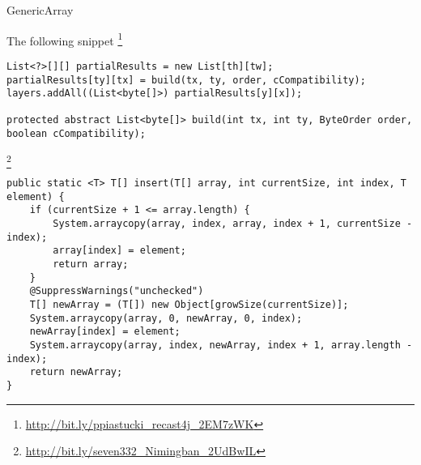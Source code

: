 \begin{pattern}{GenericArray}

\instances{}
The following snippet%
\footnote{\url{http://bit.ly/ppiastucki_recast4j_2EM7zWK}}

\begin{verbatim}
List<?>[][] partialResults = new List[th][tw];
partialResults[ty][tx] = build(tx, ty, order, cCompatibility);
layers.addAll((List<byte[]>) partialResults[y][x]);

protected abstract List<byte[]> build(int tx, int ty, ByteOrder order, boolean cCompatibility);
\end{verbatim}

\footnote{\url{http://bit.ly/seven332_Nimingban_2UdBwIL}}

\begin{verbatim}
public static <T> T[] insert(T[] array, int currentSize, int index, T element) {
    if (currentSize + 1 <= array.length) {
        System.arraycopy(array, index, array, index + 1, currentSize - index);
        array[index] = element;
        return array;
    }
    @SuppressWarnings("unchecked")
    T[] newArray = (T[]) new Object[growSize(currentSize)];
    System.arraycopy(array, 0, newArray, 0, index);
    newArray[index] = element;
    System.arraycopy(array, index, newArray, index + 1, array.length - index);
    return newArray;
}
\end{verbatim}

\detection{}

\discussion{}

\related{}

\end{pattern}